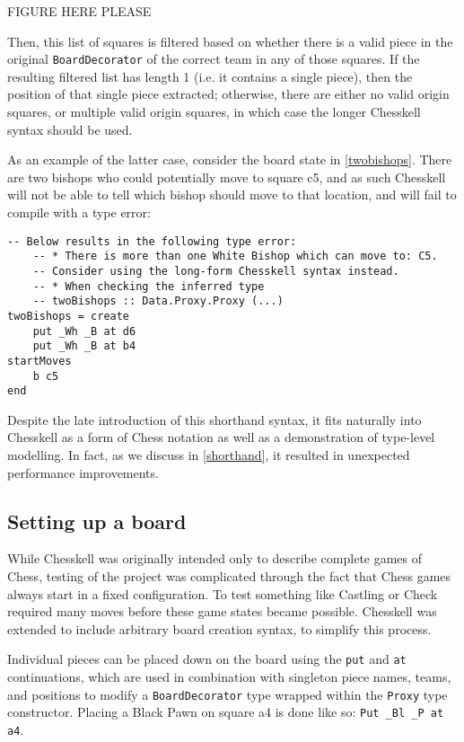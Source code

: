 \documentclass[12pt, a4paper, bibliography=totocnumbered]{scrreprt}
\newcommand{\inline}[1]{\lstinline[basicstyle=\ttfamily\footnotesize]{#1}}
\begin{document}
FIGURE HERE PLEASE %

Then, this list of squares is filtered based on whether there is a valid piece in the original \inline{BoardDecorator} of the correct team in any of those squares. If the resulting filtered list has length 1 (i.e. it contains a single piece), then the position of that single piece extracted; otherwise, there are either no valid origin squares, or multiple valid origin squares, in which case the longer Chesskell syntax should be used.

As an example of the latter case, consider the board state in \cref{twobishops}. There are two bishops who could potentially move to square c5, and as such Chesskell will not be able to tell which bishop should move to that location, and will fail to compile with a type error:

\begin{lstlisting}
-- Below results in the following type error:
    -- * There is more than one White Bishop which can move to: C5.
    -- Consider using the long-form Chesskell syntax instead.
    -- * When checking the inferred type
    -- twoBishops :: Data.Proxy.Proxy (...)
twoBishops = create
    put _Wh _B at d6
    put _Wh _B at b4
startMoves
    b c5
end
\end{lstlisting}

Despite the late introduction of this shorthand syntax, it fits naturally into Chesskell as a form of Chess notation as well as a demonstration of type-level modelling. In fact, as we discuss in \cref{shorthand}, it resulted in unexpected performance improvements.

\subsection{Setting up a board}

While Chesskell was originally intended only to describe complete games of Chess, testing of the project was complicated through the fact that Chess games always start in a fixed configuration. To test something like Castling or Check required many moves before these game states became possible. Chesskell was extended to include arbitrary board creation syntax, to simplify this process.

Individual pieces can be placed down on the board using the \inline{put} and \inline{at} continuations, which are used in combination with singleton piece names, teams, and positions to modify a \inline{BoardDecorator} type wrapped within the \inline{Proxy} type constructor. Placing a Black Pawn on square a4 is done like so: \inline{Put _Bl _P at a4}.
\end{document}
